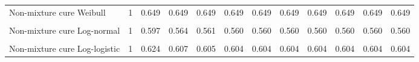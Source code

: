\documentclass[
]{article}
\begin{document}
\begin{table}[H]
{\begin{tabular}[t]{lrrrrrrrrrrr}
Non-mixture cure Weibull & 1 & 0.649 & 0.649 & 0.649 & 0.649 & 0.649 & 0.649 & 0.649 & 0.649 & 0.649 & 0.649\\
\cellcolor{gray!10}{Mixture cure Log-normal} & \cellcolor{gray!10}{1} & \cellcolor{gray!10}{0.600} & \cellcolor{gray!10}{0.573} & \cellcolor{gray!10}{0.571} & \cellcolor{gray!10}{0.571} & \cellcolor{gray!10}{0.571} & \cellcolor{gray!10}{0.571} & \cellcolor{gray!10}{0.571} & \cellcolor{gray!10}{0.571} & \cellcolor{gray!10}{0.571} & \cellcolor{gray!10}{0.571}\\
Non-mixture cure Log-normal & 1 & 0.597 & 0.564 & 0.561 & 0.560 & 0.560 & 0.560 & 0.560 & 0.560 & 0.560 & 0.560\\
\cellcolor{gray!10}{Mixture cure Log-logistic} & \cellcolor{gray!10}{1} & \cellcolor{gray!10}{0.624} & \cellcolor{gray!10}{0.606} & \cellcolor{gray!10}{0.604} & \cellcolor{gray!10}{0.604} & \cellcolor{gray!10}{0.604} & \cellcolor{gray!10}{0.603} & \cellcolor{gray!10}{0.603} & \cellcolor{gray!10}{0.603} & \cellcolor{gray!10}{0.603} & \cellcolor{gray!10}{0.603}\\
Non-mixture cure Log-logistic & 1 & 0.624 & 0.607 & 0.605 & 0.604 & 0.604 & 0.604 & 0.604 & 0.604 & 0.604 & 0.604\\
\bottomrule
\end{tabular}}
\end{table}
\end{document}
